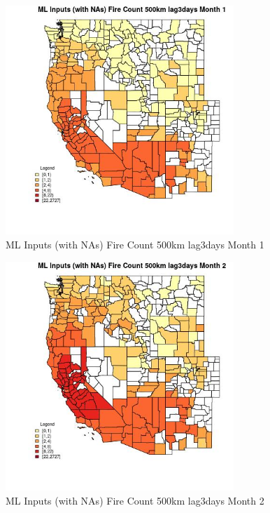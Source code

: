 \clearpage 

\begin{figure} 
\centering  
\includegraphics[width=0.77\textwidth]{Code_Outputs/Report_ML_input_PM25_Step4_part_f_de_duplicated_aves_prioritize_24hr_obswNAs_CountyFire_Count_500km_lag3daysmedianMonth1.jpg} 
\caption{\label{fig:Report_ML_input_PM25_Step4_part_f_de_duplicated_aves_prioritize_24hr_obswNAsCountyFire_Count_500km_lag3daysmedianMonth1}ML Inputs (with NAs) Fire Count 500km lag3days Month 1} 
\end{figure} 
 

\begin{figure} 
\centering  
\includegraphics[width=0.77\textwidth]{Code_Outputs/Report_ML_input_PM25_Step4_part_f_de_duplicated_aves_prioritize_24hr_obswNAs_CountyFire_Count_500km_lag3daysmedianMonth2.jpg} 
\caption{\label{fig:Report_ML_input_PM25_Step4_part_f_de_duplicated_aves_prioritize_24hr_obswNAsCountyFire_Count_500km_lag3daysmedianMonth2}ML Inputs (with NAs) Fire Count 500km lag3days Month 2} 
\end{figure} 
 

